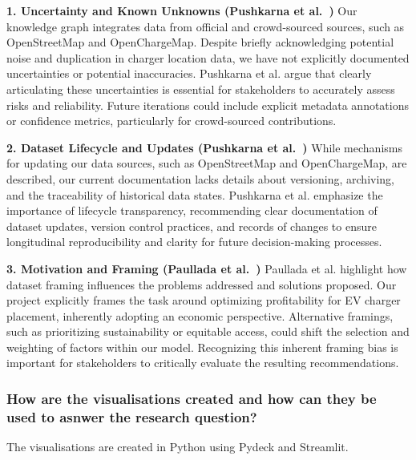 \documentclass{article}
\newcommand{\question}[1]{#1}
\begin{document}
\textbf{1. Uncertainty and Known Unknowns (Pushkarna et al.~\cite{pushkarna})}
Our knowledge graph integrates data from official and crowd-sourced sources, such as OpenStreetMap and OpenChargeMap. Despite briefly acknowledging potential noise and duplication in charger location data, we have not explicitly documented uncertainties or potential inaccuracies. Pushkarna et al. argue that clearly articulating these uncertainties is essential for stakeholders to accurately assess risks and reliability. Future iterations could include explicit metadata annotations or confidence metrics, particularly for crowd-sourced contributions.

\textbf{2. Dataset Lifecycle and Updates (Pushkarna et al.~\cite{pushkarna})}
While mechanisms for updating our data sources, such as OpenStreetMap and OpenChargeMap, are described, our current documentation lacks details about versioning, archiving, and the traceability of historical data states. Pushkarna et al. emphasize the importance of lifecycle transparency, recommending clear documentation of dataset updates, version control practices, and records of changes to ensure longitudinal reproducibility and clarity for future decision-making processes.

\textbf{3. Motivation and Framing (Paullada et al.~\cite{Paullada})}
Paullada et al. highlight how dataset framing influences the problems addressed and solutions proposed. Our project explicitly frames the task around optimizing profitability for EV charger placement, inherently adopting an economic perspective. Alternative framings, such as prioritizing sustainability or equitable access, could shift the selection and weighting of factors within our model. Recognizing this inherent framing bias is important for stakeholders to critically evaluate the resulting recommendations.

\question{\subsubsection*{How are the visualisations created and how can they be used to asnwer the research question?}}

The visualisations are created in Python using Pydeck and Streamlit.
\end{document}
